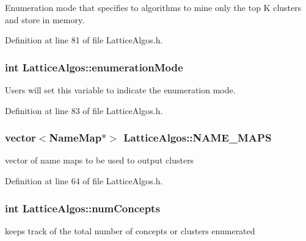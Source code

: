 Enumeration mode that specifies to algorithms to mine only the top K clusters and store in memory. 



Definition at line 81 of file LatticeAlgos.h.

\hypertarget{class_lattice_algos_a03adc61166377c993b4d1ef8f8ee12ee}{
\subsubsection[{enumerationMode}]{\setlength{\rightskip}{0pt plus 5cm}int {\bf LatticeAlgos::enumerationMode}}}
\label{class_lattice_algos_a03adc61166377c993b4d1ef8f8ee12ee}


Users will set this variable to indicate the enumeration mode. 



Definition at line 83 of file LatticeAlgos.h.

\hypertarget{class_lattice_algos_a242b1f9b2ec58cec08c4c5c074c0c1e7}{
\subsubsection[{NAME\_\-MAPS}]{\setlength{\rightskip}{0pt plus 5cm}vector$<${\bf NameMap}$\ast$$>$ {\bf LatticeAlgos::NAME\_\-MAPS}}}
\label{class_lattice_algos_a242b1f9b2ec58cec08c4c5c074c0c1e7}


vector of name maps to be used to output clusters 



Definition at line 64 of file LatticeAlgos.h.

\hypertarget{class_lattice_algos_a8a6e4d766e7f93a288e015e93b3183a0}{
\subsubsection[{numConcepts}]{\setlength{\rightskip}{0pt plus 5cm}int {\bf LatticeAlgos::numConcepts}}}
\label{class_lattice_algos_a8a6e4d766e7f93a288e015e93b3183a0}


keeps track of the total number of concepts or clusters enumerated 



